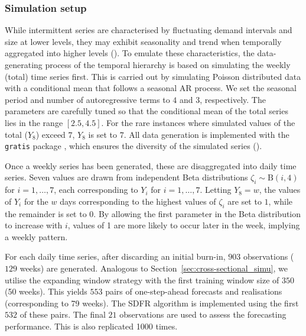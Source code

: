 \documentclass[a4paper,review,12pt,authoryear]{elsarticle}
\let\code=\texttt
\theoremstyle{definition}
\begin{document}
     \subsubsection{Simulation setup}

     While intermittent series are characterised by fluctuating demand intervals and size at lower levels, they may exhibit seasonality and trend when temporally aggregated into higher levels ().
     To emulate these characteristics, the data-generating process of the temporal hierarchy is based on simulating the weekly (total) time series first. This is carried out by simulating Poisson distributed data with a conditional mean that follows a seasonal AR process. We set the seasonal period and number of autoregressive terms to $4$ and $3$, respectively. The parameters are carefully tuned so that the conditional mean of the total series lies in the range $[2.5, 4.5]$. For the rare instances where simulated values of the total ($Y_8$) exceed $7$, $Y_8$ is set to $7$. All data generation is implemented with the \code{gratis} package \citep{gratis}, which ensures the diversity of the simulated series ().
     
     Once a weekly series has been generated, these are disaggregated into daily time series. 
     Seven values are drawn from independent Beta distributions $\zeta_i\sim\textrm{B}(i, 4)$ for $i=1,\dots,7$, each corresponding to $Y_i$ for $i=1,\dots,7$.
     Letting $Y_8=w$, the values of $Y_i$ for the $w$ days corresponding to the highest values of $\zeta_i$ are set to $1$, while the remainder is set to $0$. By allowing the first parameter in the Beta distribution to increase with $i$, values of 1 are more likely to occur later in the week, implying a weekly pattern.

     For each daily time series, after discarding an initial burn-in, $903$ observations ($129$ weeks) are generated. Analogous to Section~\ref{sec:cross-sectional_simu}, we utilise the expanding window strategy with the first training window size of $350$ (50 weeks). This yields $553$ pairs of one-step-ahead forecasts and realisations (corresponding to 79 weeks). The SDFR algorithm is implemented using the first $532$ of these pairs. The final $21$ observations are used to assess the forecasting performance. This is also replicated 1000 times.
\end{document}
